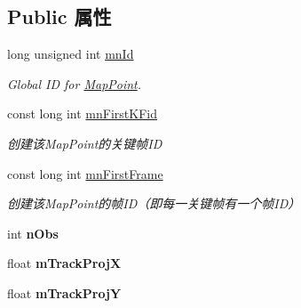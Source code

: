 \subsection*{Public 属性}
\begin{DoxyCompactItemize}
\item 
\hypertarget{classORB__SLAM2_1_1MapPoint_afba2eb4d8400a0c822ee991ba445d9be}{long unsigned int \hyperlink{classORB__SLAM2_1_1MapPoint_afba2eb4d8400a0c822ee991ba445d9be}{mn\-Id}}\label{classORB__SLAM2_1_1MapPoint_afba2eb4d8400a0c822ee991ba445d9be}

\begin{DoxyCompactList}\small\item\em Global I\-D for \hyperlink{classORB__SLAM2_1_1MapPoint}{Map\-Point}. \end{DoxyCompactList}\item 
\hypertarget{classORB__SLAM2_1_1MapPoint_ad3f9757b633aac7c026a0e5330e4b10c}{const long int \hyperlink{classORB__SLAM2_1_1MapPoint_ad3f9757b633aac7c026a0e5330e4b10c}{mn\-First\-K\-Fid}}\label{classORB__SLAM2_1_1MapPoint_ad3f9757b633aac7c026a0e5330e4b10c}

\begin{DoxyCompactList}\small\item\em 创建该\-Map\-Point的关键帧\-I\-D \end{DoxyCompactList}\item 
\hypertarget{classORB__SLAM2_1_1MapPoint_a68929d6ead18e19745ec358f2ef8776d}{const long int \hyperlink{classORB__SLAM2_1_1MapPoint_a68929d6ead18e19745ec358f2ef8776d}{mn\-First\-Frame}}\label{classORB__SLAM2_1_1MapPoint_a68929d6ead18e19745ec358f2ef8776d}

\begin{DoxyCompactList}\small\item\em 创建该\-Map\-Point的帧\-I\-D（即每一关键帧有一个帧\-I\-D） \end{DoxyCompactList}\item 
\hypertarget{classORB__SLAM2_1_1MapPoint_a2653a4c69121627fcc5ae812b1809a28}{int {\bfseries n\-Obs}}\label{classORB__SLAM2_1_1MapPoint_a2653a4c69121627fcc5ae812b1809a28}

\item 
\hypertarget{classORB__SLAM2_1_1MapPoint_a7d735552c42630c00bca4c2094fbbbf3}{float {\bfseries m\-Track\-Proj\-X}}\label{classORB__SLAM2_1_1MapPoint_a7d735552c42630c00bca4c2094fbbbf3}

\item 
\hypertarget{classORB__SLAM2_1_1MapPoint_a5ab59610931a5c2e14f502e8233571e4}{float {\bfseries m\-Track\-Proj\-Y}}\label{classORB__SLAM2_1_1MapPoint_a5ab59610931a5c2e14f502e8233571e4}


\end{DoxyCompactItemize}
